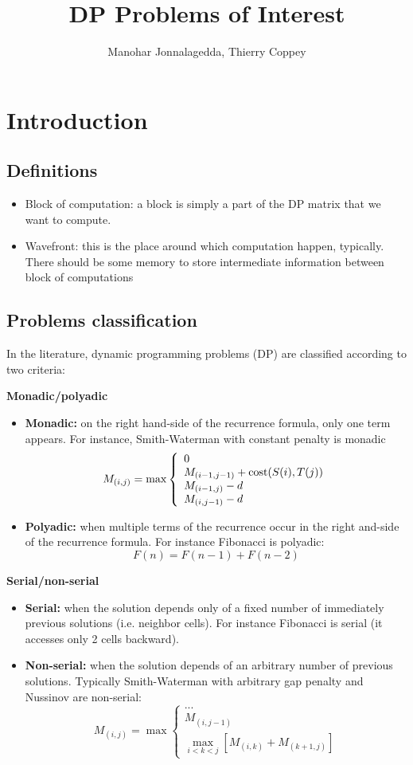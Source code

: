 \documentclass[11pt]{article}
\title{DP Problems of Interest}
\author{Manohar Jonnalagedda, Thierry Coppey}
\date{}
\def\ul{\begin{itemize}}
\def\ule{\end{itemize}}
\begin{document}
\maketitle
\pagestyle{headings}

\section{Introduction}
\subsection{Definitions}\ul
\item Block of computation: a block is simply a part of the DP matrix that we want to compute.
\item Wavefront: this is the place around which computation happen, typically. There should be some memory to store intermediate information between block of computations
\ule

\subsection{Problems classification}
In the literature, dynamic programming problems (DP) are classified according to two criteria:

\textbf{Monadic/polyadic}\ul
\item \textbf{Monadic:} on the right hand-side of the recurrence formula, only one term appears. For instance, Smith-Waterman with constant penalty is monadic
	\[M_{(i,j)}=\max\left\{\begin{array}{l} 0 \\ M_{(i-1,j-1)}+{\rm cost}(S(i),T(j))\\ M_{(i-1,j)}-d\\ M_{(i,j-1)}-d \end{array}\right. \]
\item \textbf{Polyadic:} when multiple terms of the recurrence occur in the right and-side of the recurrence formula. For instance Fibonacci is polyadic: \[F(n) = F(n-1) + F(n-2)\]
\ule

\textbf{Serial/non-serial} \ul
\item \textbf{Serial:} when the solution depends only of a fixed number of immediately previous solutions (i.e. neighbor cells). For instance Fibonacci is serial (it accesses only 2 cells backward).
\item \textbf{Non-serial:} when the solution depends of an arbitrary number of previous solutions. Typically Smith-Waterman with arbitrary gap penalty and Nussinov are non-serial:
	\[M_{(i,j)}=\max\left\{\begin{array}{l} ... \\ M_{(i,j-1)}\\ \max\limits_{i<k<j} [ M_{(i,k)}+M_{(k+1,j)} ] \end{array}\right. \]
\ule
\end{document}
